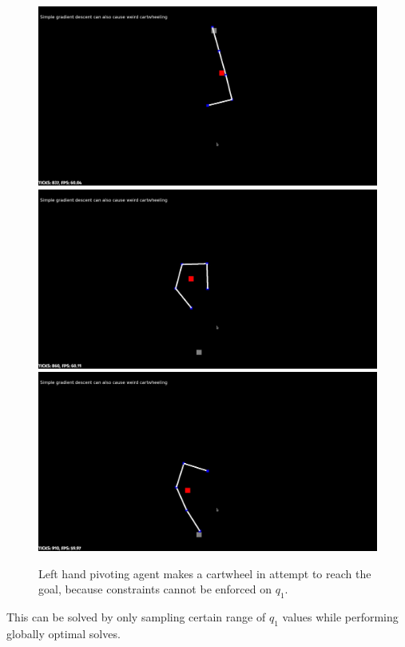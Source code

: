 \documentclass[12pt]{article}
\begin{document}
\begin{figure}[!htb]
\includegraphics[width=\linewidth]{figures/cw1.jpg}
\endminipage\hfill
{}
\includegraphics[width=\linewidth]{figures/cw2.jpg}
\endminipage\hfill
{}%
\includegraphics[width=\linewidth]{figures/cw3.jpg}
\endminipage
\caption{Left hand pivoting agent makes a cartwheel in attempt to reach the goal, because constraints cannot be enforced on $q_1$.}
\label{fig:cartwheel}
\end{figure}
This can be solved by only sampling certain range of $q_1$ values while performing globally optimal solves.
\end{document}
